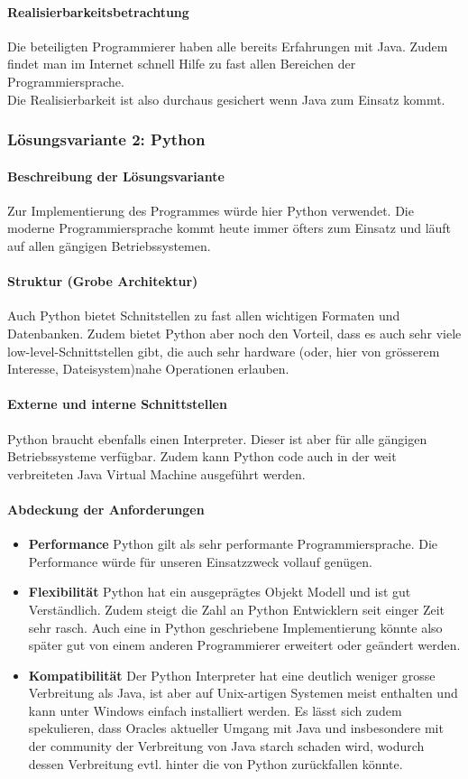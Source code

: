 \documentclass[10pt,paper=a4,final]{scrartcl}
\begin{document}
\paragraph{Realisierbarkeitsbetrachtung}
Die beteiligten Programmierer haben alle bereits Erfahrungen mit Java. Zudem findet man im Internet schnell Hilfe zu fast allen Bereichen der Programmiersprache.\\
Die Realisierbarkeit ist also durchaus gesichert wenn Java zum Einsatz kommt.
\subsubsection{L\"osungsvariante 2: Python}
\paragraph{Beschreibung der L\"osungsvariante}
Zur Implementierung des Programmes w\"urde hier Python verwendet. Die moderne Programmiersprache kommt heute immer \"ofters zum Einsatz und l\"auft auf allen g\"angigen Betriebssystemen.
\paragraph{Struktur (Grobe Architektur)}
Auch Python bietet Schnitstellen zu fast allen wichtigen Formaten und Datenbanken. Zudem bietet Python aber noch den Vorteil, dass es auch sehr viele low-level-Schnittstellen gibt, die auch sehr hardware (oder, hier von gr\"osserem Interesse, Dateisystem)nahe Operationen erlauben.
\paragraph{Externe und interne Schnittstellen}
Python braucht ebenfalls einen Interpreter. Dieser ist aber f\"ur alle g\"angigen Betriebssysteme verf\"ugbar. Zudem kann Python code auch in der weit verbreiteten Java Virtual Machine ausgef\"uhrt werden\cite{pyjava}.
\paragraph{Abdeckung der Anforderungen}
\begin{itemize}
  \item {\bf Performance} Python gilt als sehr performante Programmiersprache. Die Performance w\"urde f\"ur unseren Einsatzzweck vollauf gen\"ugen.
  \item {\bf Flexibilit\"at} Python hat ein ausgepr\"agtes Objekt Modell und ist gut Verst\"andlich. Zudem steigt die Zahl an Python Entwicklern seit einger Zeit sehr rasch. Auch eine in Python geschriebene Implementierung k\"onnte also sp\"ater gut von einem anderen Programmierer erweitert oder ge\"andert werden.
  \item {\bf Kompatibilit\"at} Der Python Interpreter hat eine deutlich weniger grosse Verbreitung als Java, ist aber auf Unix-artigen Systemen meist enthalten und kann unter Windows einfach installiert werden. Es l\"asst sich zudem spekulieren, dass Oracles aktueller Umgang mit Java und insbesondere mit der community der Verbreitung von Java starch schaden wird, wodurch dessen Verbreitung evtl. hinter die von Python zur\"uckfallen k\"onnte.
\end{itemize}
\end{document}
